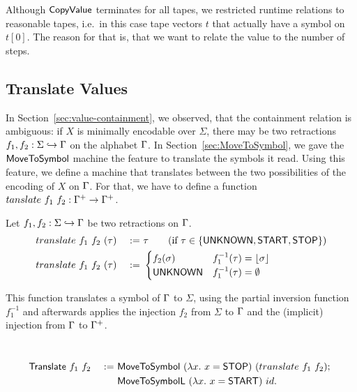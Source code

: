 Although $\mathsf{CopyValue}$ terminates for all tapes, we restricted runtime relations to reasonable tapes, i.e.\ in this case tape vectors $t$ that
actually have a symbol on $t[0]$.  The reason for that is, that we want to relate the value to the number of steps.

\subsection{Translate Values}
\label{sec:Translate}

In Section~\ref{sec:value-containment}, we observed, that the containment relation is ambiguous: if $X$ is minimally encodable over $\Sigma$, there
may be two retractions $f_1, f_2 : \Sigma \hookrightarrow \Gamma$ on the alphabet $\Gamma$.  In Section~\ref{sec:MoveToSymbol}, we gave the
$\mathsf{MoveToSymbol}$ machine the feature to translate the symbols it read.  Using this feature, we define a machine that translates between the two
possibilities of the encoding of $X$ on $\Gamma$.  For that, we have to define a function $tanslate~f_1~f_2 : \Gamma^+ \rightarrow \Gamma^+$.

\begin{definition}
  \label{def:translate}
  Let $f_1, f_2 : \Sigma \hookrightarrow \Gamma$ be two retractions on $\Gamma$.
  \begin{alignat*}{2}
    & translate~f_1~f_2~(\tau) &~:=~& \tau \qquad\text{(if $\tau \in \{\mathsf{UNKNOWN}, \mathsf{START}, \mathsf{STOP}\}$)} \\
    & translate~f_1~f_2~(\tau) &~:=~&
    \begin{cases}
      f_2(\sigma)  & f_1^{-1}(\tau) = \left\lfloor {\sigma} \right\rfloor \\
      \mathsf{UNKNOWN} & f_1^{-1}(\tau) = \emptyset
    \end{cases}
  \end{alignat*}
\end{definition}

This function translates a symbol of $\Gamma$ to $\Sigma$, using the partial inversion function $f_1^{-1}$ and afterwards applies the injection $f_2$
from $\Sigma$ to $\Gamma$ and the (implicit) injection from $\Gamma$ to $\Gamma^+$.

\begin{definition}[$\MS{Translate}$][Translate]
  ~
  \begin{alignat*}{2}
    & \mathsf{Translate}~f_1~f_2 &~:=~& \mathsf{MoveToSymbol}~(\lambda x.~x=\mathsf{STOP})~(translate~f_1~f_2) ;~ \\
    &                        &~  ~& \mathsf{MoveToSymbolL}~(\lambda x.~x=\mathsf{START})~id.
  \end{alignat*}
\end{definition}

